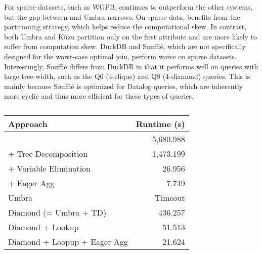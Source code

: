 For sparse datasets, such as WGPB, \name continues to outperform the
other systems, but the gap between \name and Umbra
narrows.  On sparse
data, \name benefits from the partitioning strategy, which helps
reduce the computational skew. In contrast, both Umbra and Kùzu
partition only on the first attribute and are more likely to suffer
from computation skew.  DuckDB and Soufflé,
which are not specifically designed for the worst-case optimal join,
perform worse on sparse datasets. Interestingly, Soufflé differs from
DuckDB in that it performs well on queries with large tree-width, such
as the Q6 (4-clique) and Q8 (4-diamond) queries. This is mainly
because Soufflé is optimized for Datalog queries, which are inherently
more cyclic and thus more efficient for these types of queries.


{
\begin{table}[t]
	\caption{}
	\label{tab:opt_comp}
	\begin{tabular}{lr}
		\toprule
		Approach & Runtime (s) \\
		\midrule
		\name & 5,680.988 \\
		\name + Tree Decomposition~\cite{DBLP:conf/sigmod/AbergerTOR16} & 1,473.199 \\
		\name + Variable Elimination~\cite{DBLP:conf/pods/KhamisNR16} & 26.956 \\
		\name + Eager Agg~\cite{DBLP:conf/pods/KhamisNR16} & 7.749 \\
		Umbra & Timeout\\
		Diamond (= Umbra + TD) & 436.257 \\
		Diamond + Lookup & 51.513 \\
		Diamond + Loopup + Eager Agg & 21.624 \\
		\bottomrule
	\end{tabular}
\end{table}
}

